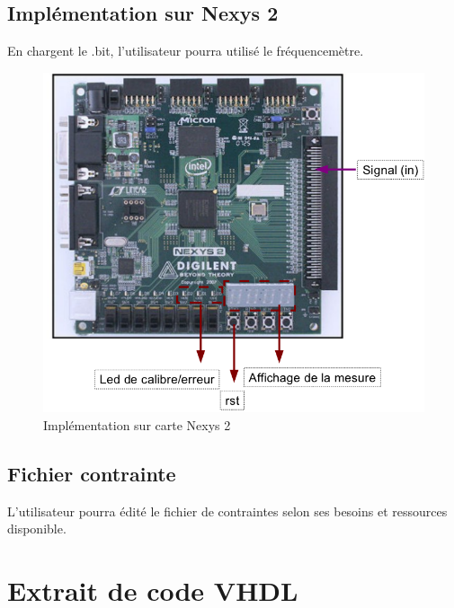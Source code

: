 \documentclass[a4paper,11pt]{article}
\begin{document}
\subsection{Implémentation sur Nexys 2}
En chargent le .bit, l'utilisateur pourra utilisé le fréquencemètre.
\begin{figure}[H]
\begin{center}
	\includegraphics[scale=.5]{fpga.png}
	\caption{Implémentation sur carte Nexys 2}
\end{center}
\end{figure}

\subsection{Fichier contrainte}
L'utilisateur pourra édité le fichier de contraintes selon ses besoins et ressources disponible.

\newpage
\section{Extrait de code VHDL}

\end{document}
